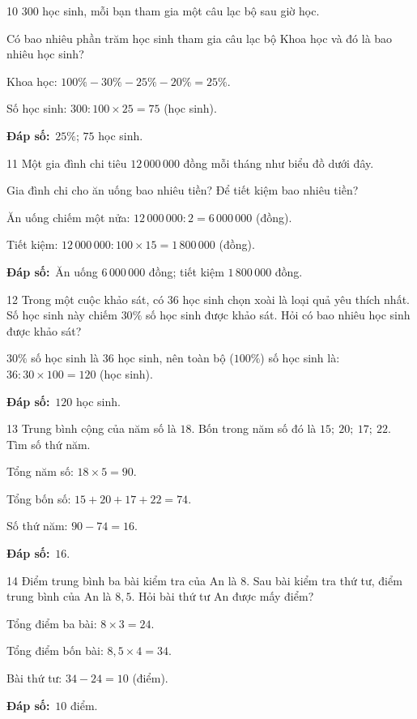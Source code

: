 \documentclass[11pt]{article}
\newif\ifsol \solfalse
\providecommand{\AnsWord}{Đáp số}
\newcommand{\dapso}[1]{\par\textbf{\AnsWord:}\ #1}
\newcommand{\probsol}[1]{%
  \begin{lrbox}{\solmeasure}\begin{minipage}{\dimexpr\linewidth-24pt\relax}#1\end{minipage}\end{lrbox}%
  \ifsol
    \begin{solbox}#1\end{solbox}%
  \else
    \setlength{\solht}{\dimexpr\ht\solmeasure+\dp\solmeasure+0.85cm\relax}%
    \ifdim\solht<1.35cm\setlength{\solht}{1.35cm}\fi
    \begin{tcolorbox}[colback=white,colframe=Line,boxrule=0.8pt,arc=5pt,
      left=8pt,right=8pt,top=4pt,bottom=4pt,height=\solht]{\footnotesize\color{Slate}\itshape\WorkWord}\end{tcolorbox}%
  \fi}
\newcommand{\gap}{\vspace{0.3cm}}
\def\WorkWord{Bài làm:}
\def\AnsWord{Đáp số}
\begin{document}
\gap
\needspace{7.5cm}
\begin{probbox}{10}{\relax}
$300$ học sinh, mỗi bạn tham gia một câu lạc bộ sau giờ học.
\begin{center}
\end{center}
Có bao nhiêu phần trăm học sinh tham gia câu lạc bộ Khoa học và đó là bao nhiêu học sinh?
\end{probbox}
\probsol{
Khoa học: $100\%-30\%-25\%-20\%=25\%$.\par Số học sinh: $300:100\times25=75$ (học sinh).
\dapso{$25\%$; $75$ học sinh.}}
\gap
\needspace{7.5cm}
\begin{probbox}{11}{\relax}
Một gia đình chi tiêu $12\,000\,000$ đồng mỗi tháng như biểu đồ dưới đây.
\begin{center}
\end{center}
Gia đình chi cho ăn uống bao nhiêu tiền? Để tiết kiệm bao nhiêu tiền?
\end{probbox}
\probsol{
Ăn uống chiếm một nửa: $12\,000\,000:2=6\,000\,000$ (đồng).\par
Tiết kiệm: $12\,000\,000:100\times15=1\,800\,000$ (đồng).
\dapso{Ăn uống $6\,000\,000$ đồng; tiết kiệm $1\,800\,000$ đồng.}}
\gap
\begin{probbox}{12}{\relax}
Trong một cuộc khảo sát, có $36$ học sinh chọn xoài là loại quả yêu thích nhất. Số học sinh này chiếm $30\%$ số học sinh được khảo sát. Hỏi có bao nhiêu học sinh được khảo sát?
\end{probbox}
\probsol{
$30\%$ số học sinh là $36$ học sinh, nên toàn bộ ($100\%$) số học sinh là: $36:30\times100=120$ (học sinh).
\dapso{$120$ học sinh.}}
\gap
\begin{probbox}{13}{\relax}
Trung bình cộng của năm số là $18$. Bốn trong năm số đó là $15;\ 20;\ 17;\ 22$. Tìm số thứ năm.
\end{probbox}
\probsol{
Tổng năm số: $18\times5=90$.\par Tổng bốn số: $15+20+17+22=74$.\par Số thứ năm: $90-74=16$.
\dapso{$16$.}}
\gap
\begin{probbox}{14}{\relax}
Điểm trung bình ba bài kiểm tra của An là $8$. Sau bài kiểm tra thứ tư, điểm trung bình của An là $8{,}5$. Hỏi bài thứ tư An được mấy điểm?
\end{probbox}
\probsol{
Tổng điểm ba bài: $8\times3=24$.\par Tổng điểm bốn bài: $8{,}5\times4=34$.\par Bài thứ tư: $34-24=10$ (điểm).
\dapso{$10$ điểm.}}
\end{document}

